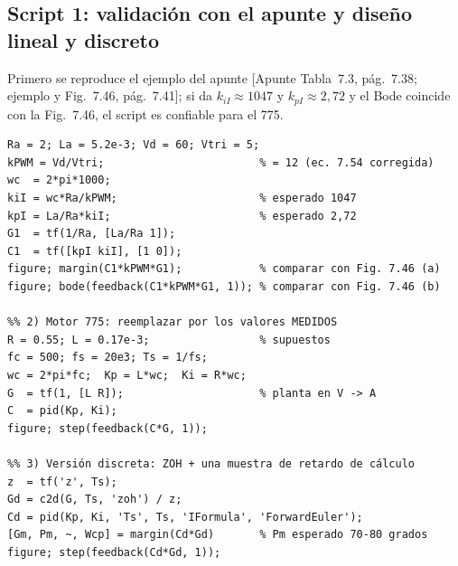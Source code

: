 \documentclass[11pt,a4paper]{article}
\newcommand{\fuente}[1]{{\footnotesize\textcolor{black!60}{[#1]}}}
\begin{document}
\subsection{Script 1: validación con el apunte y diseño lineal y discreto}
Primero se reproduce el ejemplo del apunte \fuente{Apunte Tabla~7.3, pág.~7.38; ejemplo y Fig.~7.46, pág.~7.41}; si da $k_{iI}\approx1047$ y $k_{pI}\approx2{,}72$ y el Bode coincide con la Fig.~7.46, el script es confiable para el 775.
\begin{lstlisting}[language=matlabsimple]
%% 1) Validación con el ejemplo del apunte (Tabla 7.3)
Ra = 2; La = 5.2e-3; Vd = 60; Vtri = 5;
kPWM = Vd/Vtri;                        % = 12 (ec. 7.54 corregida)
wc  = 2*pi*1000;
kiI = wc*Ra/kPWM;                      % esperado 1047
kpI = La/Ra*kiI;                       % esperado 2,72
G1  = tf(1/Ra, [La/Ra 1]);
C1  = tf([kpI kiI], [1 0]);
figure; margin(C1*kPWM*G1);            % comparar con Fig. 7.46 (a)
figure; bode(feedback(C1*kPWM*G1, 1)); % comparar con Fig. 7.46 (b)

%% 2) Motor 775: reemplazar por los valores MEDIDOS
R = 0.55; L = 0.17e-3;                 % supuestos
fc = 500; fs = 20e3; Ts = 1/fs;
wc = 2*pi*fc;  Kp = L*wc;  Ki = R*wc;
G  = tf(1, [L R]);                     % planta en V -> A
C  = pid(Kp, Ki);
figure; step(feedback(C*G, 1));

%% 3) Versión discreta: ZOH + una muestra de retardo de cálculo
z  = tf('z', Ts);
Gd = c2d(G, Ts, 'zoh') / z;
Cd = pid(Kp, Ki, 'Ts', Ts, 'IFormula', 'ForwardEuler');
[Gm, Pm, ~, Wcp] = margin(Cd*Gd)       % Pm esperado 70-80 grados
figure; step(feedback(Cd*Gd, 1));
\end{lstlisting}
\end{document}
